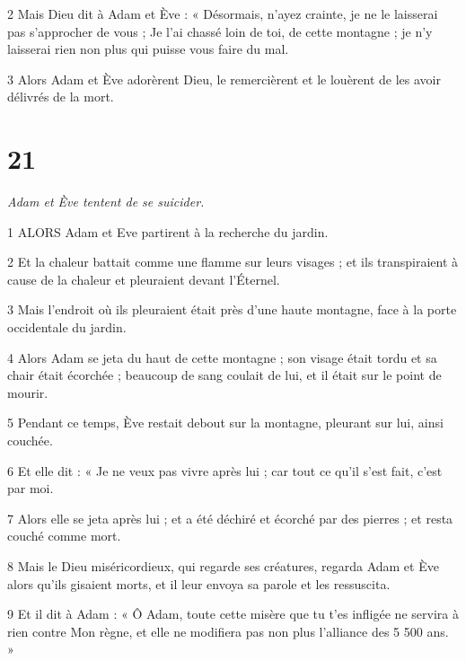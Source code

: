 \par 2 Mais Dieu dit à Adam et Ève : « Désormais, n'ayez crainte, je ne le laisserai pas s'approcher de vous ; Je l'ai chassé loin de toi, de cette montagne ; je n’y laisserai rien non plus qui puisse vous faire du mal.

\par 3 Alors Adam et Ève adorèrent Dieu, le remercièrent et le louèrent de les avoir délivrés de la mort.

\chapter{21}

\par \textit{Adam et Ève tentent de se suicider.}

\par 1 ALORS Adam et Eve partirent à la recherche du jardin.

\par 2 Et la chaleur battait comme une flamme sur leurs visages ; et ils transpiraient à cause de la chaleur et pleuraient devant l'Éternel.

\par 3 Mais l'endroit où ils pleuraient était près d'une haute montagne, face à la porte occidentale du jardin.

\par 4 Alors Adam se jeta du haut de cette montagne ; son visage était tordu et sa chair était écorchée ; beaucoup de sang coulait de lui, et il était sur le point de mourir.

\par 5 Pendant ce temps, Ève restait debout sur la montagne, pleurant sur lui, ainsi couchée.

\par 6 Et elle dit : « Je ne veux pas vivre après lui ; car tout ce qu’il s’est fait, c’est par moi.

\par 7 Alors elle se jeta après lui ; et a été déchiré et écorché par des pierres ; et resta couché comme mort.

\par 8 Mais le Dieu miséricordieux, qui regarde ses créatures, regarda Adam et Ève alors qu'ils gisaient morts, et il leur envoya sa parole et les ressuscita.

\par 9 Et il dit à Adam : « Ô Adam, toute cette misère que tu t'es infligée ne servira à rien contre Mon règne, et elle ne modifiera pas non plus l'alliance des 5 500 ans. »

